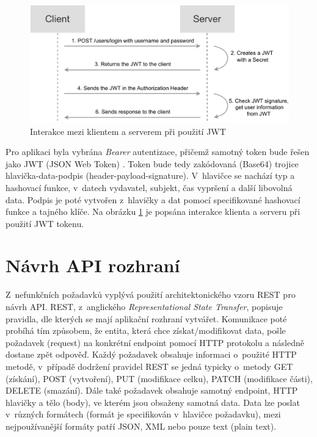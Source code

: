 \documentclass[thesis=M,czech]{FITthesis}[2019/12/23]
\begin{document}
\begin{figure}
	\centering
	\includegraphics[width=1\linewidth]{images/jwt-flow.pdf}
  	\caption{Interakce mezi klientem a serverem při použití JWT}
  	\label{img:jwt-flow}
\end{figure}

Pro aplikaci byla vybrána \textit{Bearer} autentizace, přičemž samotný token bude řešen jako JWT (JSON Web Token) \cite{jwt}. Token bude tedy zakódovaná (Base64) trojice hlavička-data-podpis (header-payload-signature). V~hlavičce se nachází typ a hashovací funkce, v~datech vydavatel, subjekt, čas vypršení a další libovolná data. Podpis je poté vytvořen z~hlavičky a dat pomocí specifikované hashovací funkce a tajného klíče. Na obrázku \ref{img:jwt-flow} je popsána interakce klienta a serveru při použití JWT tokenu.

\section{Návrh API rozhraní}
Z~nefunkčních požadavků vyplývá použití architektonického vzoru REST pro návrh API. REST, z~anglického \textit{Representational State Transfer}, popisuje pravidla, dle kterých se mají aplikační rozhraní vytvářet. Komunikace poté probíhá tím způsobem, že entita, která chce získat/modifikovat data, pošle požadavek (request) na konkrétní endpoint pomocí HTTP protokolu a následně dostane zpět odpověď. Každý požadavek obsahuje informaci o~použité HTTP metodě, v~případě dodržení pravidel REST se jedná typicky o~metody GET (získání), POST (vytvoření), PUT (modifikace celku), PATCH (modifikace části), DELETE (smazání). Dále také požadavek obsahuje samotný endpoint, HTTP hlavičky a tělo (body), ve kterém jsou obsaženy samotná data. Data lze poslat v~různých formátech (formát je specifikován v~hlavičce požadavku), mezi nejpoužívanější formáty patří JSON, XML nebo pouze text (plain text). \cite{rest-1, rest-2}
\end{document}
